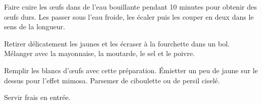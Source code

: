\begin{nouvellerecette}


Faire cuire les œufs dans de l'eau bouillante pendant 10 minutes pour obtenir des œufs durs. Les passer sous l'eau froide, les écaler puis les couper en deux dans le sens de la longueur.

Retirer délicatement les jaunes et les écraser à la fourchette dans un bol. Mélanger avec la mayonnaise, la moutarde, le sel et le poivre.

Remplir les blancs d'œufs avec cette préparation. Émietter un peu de jaune sur le dessus pour l'effet mimosa. Parsemer de ciboulette ou de persil ciselé.

Servir frais en entrée.


\end{nouvellerecette}
